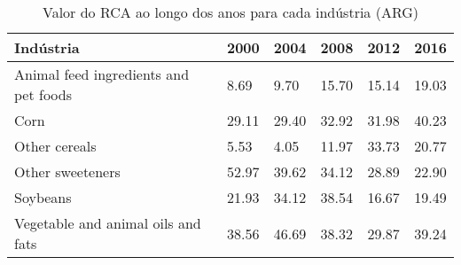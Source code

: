 \begin{table}
\centering
\caption{Valor do RCA ao longo dos anos para cada indústria (ARG)}
\begin{tabular}{p{6cm}p{1.5cm}p{1.5cm}p{1.5cm}p{1.5cm}p{1.5cm}}
\toprule
                            Indústria &  2000 &  2004 &  2008 &  2012 &  2016 \\
\midrule
Animal feed ingredients and pet foods &  8.69 &  9.70 & 15.70 & 15.14 & 19.03 \\
                                 Corn & 29.11 & 29.40 & 32.92 & 31.98 & 40.23 \\
                        Other cereals &  5.53 &  4.05 & 11.97 & 33.73 & 20.77 \\
                     Other sweeteners & 52.97 & 39.62 & 34.12 & 28.89 & 22.90 \\
                             Soybeans & 21.93 & 34.12 & 38.54 & 16.67 & 19.49 \\
   Vegetable and animal oils and fats & 38.56 & 46.69 & 38.32 & 29.87 & 39.24 \\
\bottomrule
\end{tabular}
\end{table}
